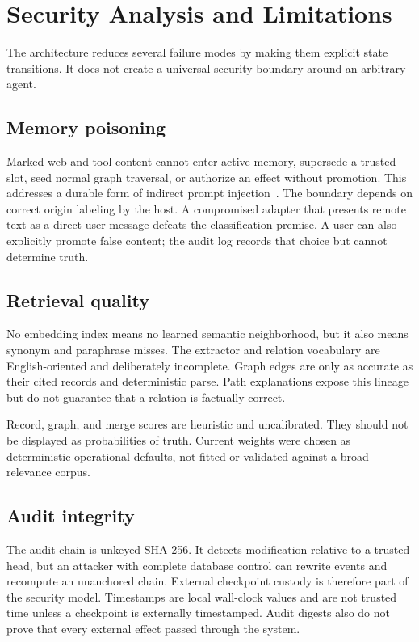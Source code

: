 \section{Security Analysis and Limitations}
\label{sec:limitations}

The architecture reduces several failure modes by making them explicit state transitions. It does not create a universal security boundary around an arbitrary agent.

\subsection{Memory poisoning}

Marked web and tool content cannot enter active memory, supersede a trusted slot, seed normal graph traversal, or authorize an effect without promotion. This addresses a durable form of indirect prompt injection~\cite{greshake2023indirect}. The boundary depends on correct origin labeling by the host. A compromised adapter that presents remote text as a direct user message defeats the classification premise. A user can also explicitly promote false content; the audit log records that choice but cannot determine truth.

\subsection{Retrieval quality}

No embedding index means no learned semantic neighborhood, but it also means synonym and paraphrase misses. The extractor and relation vocabulary are English-oriented and deliberately incomplete. Graph edges are only as accurate as their cited records and deterministic parse. Path explanations expose this lineage but do not guarantee that a relation is factually correct.

Record, graph, and merge scores are heuristic and uncalibrated. They should not be displayed as probabilities of truth. Current weights were chosen as deterministic operational defaults, not fitted or validated against a broad relevance corpus.

\subsection{Audit integrity}

The audit chain is unkeyed SHA-256. It detects modification relative to a trusted head, but an attacker with complete database control can rewrite events and recompute an unanchored chain. External checkpoint custody is therefore part of the security model. Timestamps are local wall-clock values and are not trusted time unless a checkpoint is externally timestamped. Audit digests also do not prove that every external effect passed through the system.

